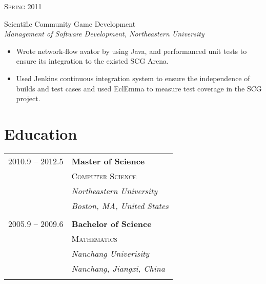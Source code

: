 \documentclass[10pt]{article} %
\begin{document}
{\begin{minipage}[t]{0.44\textwidth}

{\raggedleft\textsc{Spring 2011}\par}

{\raggedright\large Scientific Community Game Development\\
\textit{Management of Software Development, Northeastern University}\\[5pt]}

\begin{itemize}
       \item Wrote network-flow avator by using Java, and performanced unit tests to ensure its integration to the existed SCG Arena.\vspace*{-8pt}
        \item Used Jenkins continuous integration system to ensure the independence of builds and test cases and used EclEmma to measure test coverage in the SCG project.
\end{itemize}
 


\section{Education} 

\begin{tabular}{rl} %


2010.9 -- \textsc{2012.5} & \textbf{Master of Science} \\ 
& \textsc{Computer Science} \\ 
& \textit{Northeastern University}\\
& \textit{Boston, MA, United States}\\
&\\
	 

2005.9 -- \textsc{2009.6} & \textbf{Bachelor of Science} \\ 
& \textsc{Mathematics} \\ 
& \textit{Nanchang Univerisity}\\
& \textit{Nanchang, Jiangxi, China}\\
&\\
	 

\end{tabular}
\end{minipage}}
\end{document}
